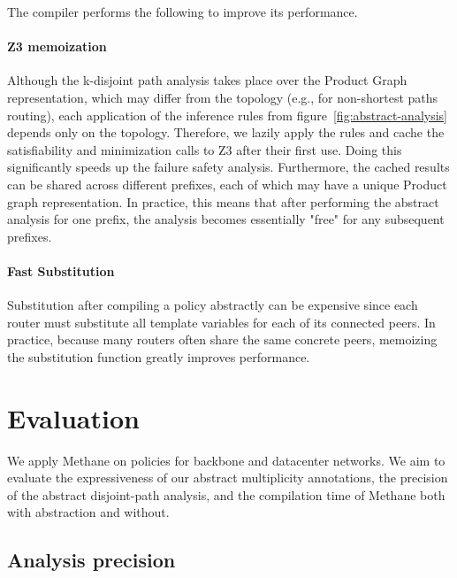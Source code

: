 \documentclass{sig-alternate-10pt}
\newcommand{\sysname}{{\small \sf Methane}\xspace}
\newcommand{\para}[1]{\paragraph*{\textbf{#1}}}
\begin{document}
The compiler performs the following to improve its performance.

\para{Z3 memoization}

Although the k-disjoint path analysis takes place over the Product Graph representation, which may differ from the topology (e.g., for non-shortest paths routing), each application of the inference rules from figure~\ref{fig:abstract-analysis} depends only on the topology. Therefore, we lazily apply the rules and cache the satisfiability and minimization calls to Z3 after their first use. Doing this significantly speeds up the failure safety analysis. Furthermore, the cached results can be shared across different prefixes, each of which may have a unique Product graph representation. In practice, this means that after performing the abstract analysis for one prefix, the analysis becomes essentially "free" for any subsequent prefixes.

\para{Fast Substitution}

Substitution after compiling a policy abstractly can be expensive since each router must substitute all template variables for each of its connected peers. In practice, because many routers often share the same concrete peers, memoizing the substitution function greatly improves performance.


%
%
%
%


\section{Evaluation}
\label{sec:evaluation}

We apply \sysname on policies for backbone and datacenter networks. We aim to evaluate the expressiveness of our abstract multiplicity annotations, the precision of the abstract disjoint-path analysis, and the compilation time of \sysname both with abstraction and without.

\subsection{Analysis precision}
\end{document}
